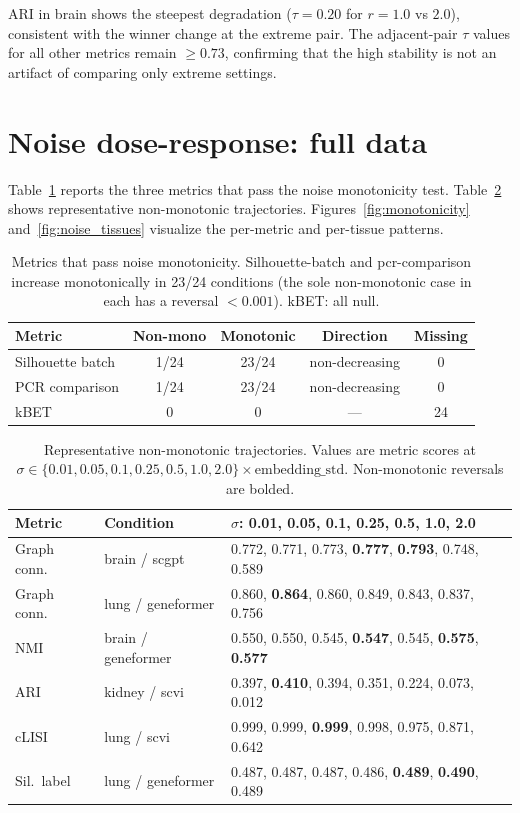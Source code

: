 \documentclass[11pt]{article}
\begin{document}
ARI in brain shows the steepest degradation ($\tau = 0.20$ for $r = 1.0$ vs $2.0$), consistent with the winner change at the extreme pair. The adjacent-pair $\tau$ values for all other metrics remain $\geq 0.73$, confirming that the high stability is not an artifact of comparing only extreme settings.


\section{Noise dose-response: full data}
\label{app:noise}

Table~\ref{tab:app_noise_pass} reports the three metrics that pass the noise monotonicity test. Table~\ref{tab:app_noise_fail} shows representative non-monotonic trajectories. Figures~\ref{fig:monotonicity} and~\ref{fig:noise_tissues} visualize the per-metric and per-tissue patterns.

\begin{table}[h!]
\centering
\caption{Metrics that pass noise monotonicity. Silhouette-batch and pcr-comparison increase monotonically in 23/24 conditions (the sole non-monotonic case in each has a reversal $< 0.001$). kBET: all null.}
\label{tab:app_noise_pass}
\small
\begin{tabular}{@{}lcccc@{}}
\toprule
Metric & Non-mono & Monotonic & Direction & Missing \\
\midrule
Silhouette batch & 1/24 & 23/24 & non-decreasing & 0 \\
PCR comparison   & 1/24 & 23/24 & non-decreasing & 0 \\
kBET             & 0    & 0     & ---            & 24 \\
\bottomrule
\end{tabular}
\end{table}

\begin{table}[h!]
\centering
\caption{Representative non-monotonic trajectories. Values are metric scores at $\sigma \in \{0.01, 0.05, 0.1, 0.25, 0.5, 1.0, 2.0\} \times \text{embedding\_std}$. Non-monotonic reversals are bolded.}
\label{tab:app_noise_fail}
\footnotesize
\begin{tabular}{@{}llp{}@{}}
\toprule
Metric & Condition & $\sigma$: 0.01, 0.05, 0.1, 0.25, 0.5, 1.0, 2.0 \\
\midrule
Graph conn. & brain / scgpt & 0.772, 0.771, 0.773, \textbf{0.777}, \textbf{0.793}, 0.748, 0.589 \\
Graph conn. & lung / geneformer & 0.860, \textbf{0.864}, 0.860, 0.849, 0.843, 0.837, 0.756 \\
NMI & brain / geneformer & 0.550, 0.550, 0.545, \textbf{0.547}, 0.545, \textbf{0.575}, \textbf{0.577} \\
ARI & kidney / scvi & 0.397, \textbf{0.410}, 0.394, 0.351, 0.224, 0.073, 0.012 \\
cLISI & lung / scvi & 0.999, 0.999, \textbf{0.999}, 0.998, 0.975, 0.871, 0.642 \\
Sil.\ label & lung / geneformer & 0.487, 0.487, 0.487, 0.486, \textbf{0.489}, \textbf{0.490}, 0.489 \\
\bottomrule
\end{tabular}
\end{table}
\end{document}
